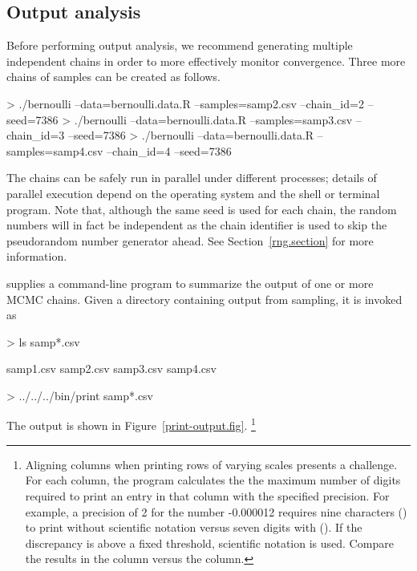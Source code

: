 \documentclass[article]{jss}
\begin{document}
\subsection{Output analysis}

Before performing output analysis, we recommend generating multiple
independent chains in order to more effectively monitor convergence.
Three more chains of samples can be created as follows.
%
\begin{CodeChunk}
{\small
\begin{CodeInput}
> ./bernoulli --data=bernoulli.data.R --samples=samp2.csv --chain_id=2 --seed=7386
> ./bernoulli --data=bernoulli.data.R --samples=samp3.csv --chain_id=3 --seed=7386
> ./bernoulli --data=bernoulli.data.R --samples=samp4.csv --chain_id=4 --seed=7386
\end{CodeInput}
}
\end{CodeChunk}
%
The chains can be safely run in parallel under different processes;
details of parallel execution depend on the operating system and the shell or
terminal program. Note that, although the same seed is used for each chain, the
random numbers will in fact be independent as the chain identifier
is used to skip the pseudorandom number generator ahead.  See
Section~\ref{rng.section} for more information.

 supplies a command-line program  to
summarize the output of one or more MCMC chains.  Given a directory
containing output from sampling, it is invoked as
%
\begin{CodeChunk}
\begin{CodeInput}
> ls samp*.csv
\end{CodeInput}
\begin{CodeOutput}
samp1.csv	samp2.csv	samp3.csv	samp4.csv
\end{CodeOutput}
\begin{CodeInput}
> ../../../bin/print samp*.csv
\end{CodeInput}

\end{CodeChunk}
%
The output is shown in Figure~\ref{print-output.fig}.%
%
\footnote{Aligning columns when printing rows of varying scales
  presents a challenge.  For each column, the program calculates the
  the maximum number of digits required to print an entry in that
  column with the specified precision. For example, a precision of 2
  for the number -0.000012 requires nine characters ()
  to print without scientific notation versus seven digits with
  ().  If the discrepancy is above a fixed threshold,
  scientific notation is used.  Compare the results in the 
  column versus the  column.}
%
\end{document}
